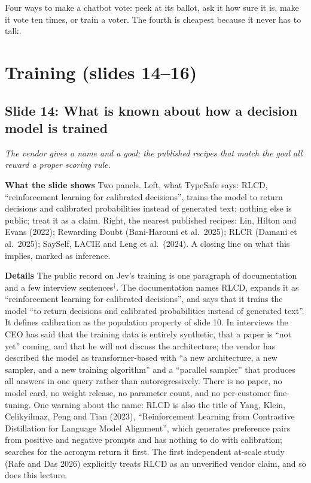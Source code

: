 \documentclass[11pt,letterpaper]{article}
\newcommand{\setstage}[1]{\colorlet{stagec}{#1}}
\newcommand{\slide}[3]{%
  \subsection[Slide #1: #2]{Slide #1: #2}%
  {\color{muted}\itshape #3\par}\medskip}
\newcommand{\para}[1]{\medskip\noindent\textbf{#1}\quad}
\newenvironment{intuition}{\begin{tcolorbox}[intuitionbox]}{\end{tcolorbox}}
\begin{document}
\begin{intuition}
Four ways to make a chatbot vote: peek at its ballot, ask it how sure it is, make it vote ten times, or train a voter. The fourth is cheapest because it never has to talk.
\end{intuition}
\setstage{attn}
\section{Training (slides 14--16)}

\slide{14}{What is known about how a decision model is trained}{The vendor gives a name and a goal; the published recipes that match the goal all reward a proper scoring rule.}

\para{What the slide shows} Two panels. Left, what TypeSafe says: RLCD, ``reinforcement learning for calibrated decisions'', trains the model to return decisions and calibrated probabilities instead of generated text; nothing else is public; treat it as a claim. Right, the nearest published recipes: Lin, Hilton and Evans (2022); Rewarding Doubt (Bani-Harouni et al.\ 2025); RLCR (Damani et al.\ 2025); SaySelf, LACIE and Leng et al.\ (2024). A closing line on what this implies, marked as inference.

\para{Details} The public record on Jev's training is one paragraph of documentation and a few interview sentences$^\dagger$. The documentation names RLCD, expands it as ``reinforcement learning for calibrated decisions'', and says that it trains the model ``to return decisions and calibrated probabilities instead of generated text''. It defines calibration as the population property of slide 10. In interviews the CEO has said that the training data is entirely synthetic, that a paper is ``not yet'' coming, and that he will not discuss the architecture; the vendor has described the model as transformer-based with ``a new architecture, a new sampler, and a new training algorithm'' and a ``parallel sampler'' that produces all answers in one query rather than autoregressively. There is no paper, no model card, no weight release, no parameter count, and no per-customer fine-tuning. One warning about the name: RLCD is also the title of Yang, Klein, Celikyilmaz, Peng and Tian (2023), ``Reinforcement Learning from Contrastive Distillation for Language Model Alignment'', which generates preference pairs from positive and negative prompts and has nothing to do with calibration; searches for the acronym return it first. The first independent at-scale study (Rafe and Das 2026) explicitly treats RLCD as an unverified vendor claim, and so does this lecture.
\end{document}
